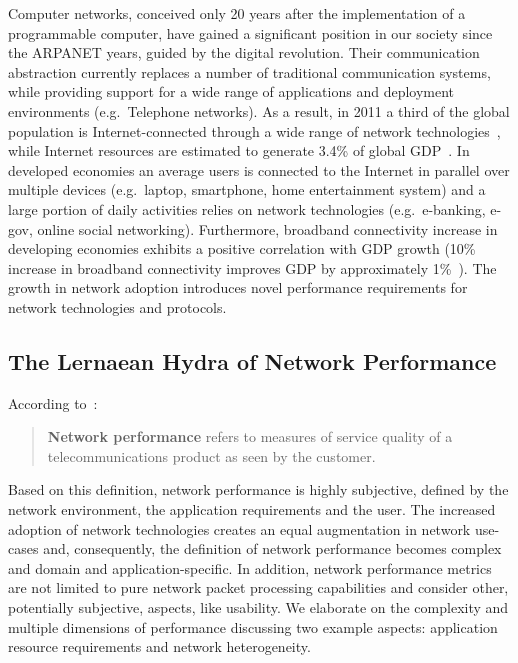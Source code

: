 Computer networks, conceived only 20 years after the implementation of a
programmable computer, have gained a significant position in our society since
the ARPANET years, guided by the digital revolution.  Their communication
abstraction currently replaces a number of traditional communication systems,
while providing support for a wide range of applications and deployment
environments (e.g.~Telephone networks).  As a result, in 2011 a third of the
global population is Internet-connected through a wide range of network
technologies~\cite{itufacts2011}, while Internet resources are estimated to
generate 3.4\% of global GDP~\cite{duRausas:2011un}.  In developed economies an
average users is connected to the Internet in parallel over multiple devices
(e.g.~laptop, smartphone, home entertainment system) and a large portion of
daily activities relies on network technologies (e.g.~e-banking, e-gov, online
social networking). Furthermore, broadband connectivity increase in developing
economies exhibits a positive correlation with GDP growth (10\% increase in
broadband connectivity improves GDP by approximately 1\%~\cite{katz2011}).  The
growth in network adoption introduces novel performance requirements for network
technologies and protocols.  

\subsection{The Lernaean Hydra of Network Performance} \label{sec:intro:perf_complexity}

According to~\cite{wikiperf}: 
\begin{quotation} 
  \textbf{Network performance} refers to measures of service quality of a
  telecommunications product as seen by the customer.
\end{quotation}

Based on this definition, network performance is highly subjective, defined by
the network environment, the application requirements and the user. The
increased adoption of network technologies creates an equal augmentation in
network use-cases and, consequently, the definition of network performance
becomes complex and domain and application-specific. In addition, network
performance metrics are not limited to pure network packet processing
capabilities and consider other, potentially subjective, aspects, like
usability.  We elaborate on the complexity and multiple dimensions of
performance discussing two example aspects: application resource requirements
and network heterogeneity. 

